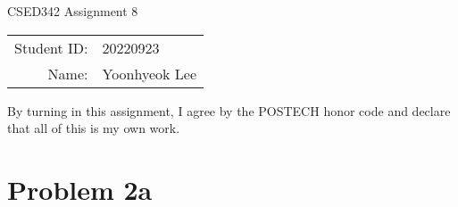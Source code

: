 \documentclass[12pt]{article}
\begin{document}
\begin{center}
{\Large CSED342 Assignment 8 \vspace{10pt}}

\begin{tabular}{rl}
Student ID: & 20220923 \\
Name: & Yoonhyeok Lee \\
\end{tabular}
\end{center}

\begin{center}
By turning in this assignment, I agree by the POSTECH honor code and declare that all of this is my own work.
\end{center}

\section*{Problem 2a}
\end{document}

